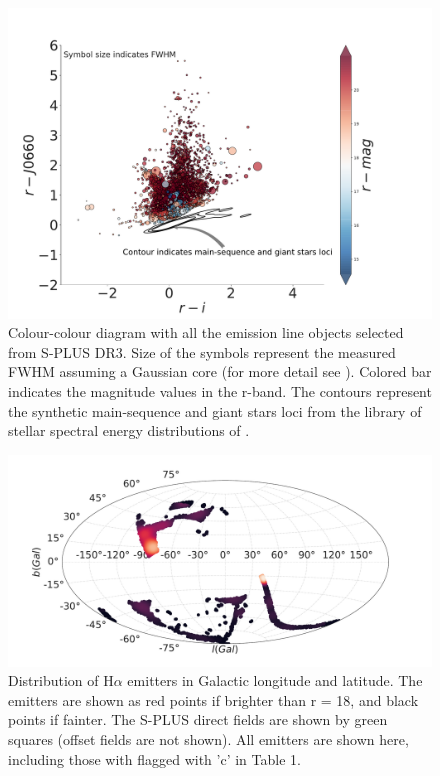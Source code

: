 \documentclass[fleqn,usenatbib]{mnras}
\begin{document}
\begin{figure}
	\includegraphics[width=0.9\linewidth]{Figs/final-emitters.pdf}
        \caption{Colour-colour diagram with all the emission line objects selected
          from S-PLUS DR3. Size of the symbols represent the measured FWHM assuming
          a Gaussian core (for more detail see \citealt{Fernandes:2021}). Colored
          bar indicates the magnitude values in the r-band. The contours represent
          the synthetic main-sequence and giant stars loci from the library of stellar
          spectral energy distributions of \citet{Pickles:1998}.}
    \label{fig:emission}
\end{figure}

\begin{figure}
\includegraphics[width=0.9\linewidth]{Figs/halpha-emitters-galactic-aitoff.pdf}
\centering
{}
\caption{Distribution of H{$\alpha$} emitters in Galactic longitude and latitude.
  The emitters are shown as red points if brighter than r = 18, and black points if
  fainter. The S-PLUS direct fields are shown by green squares (offset fields are
  not shown). All emitters are shown here, including those with flagged with 'c' in
Table 1.}
\end{figure}
\end{document}
